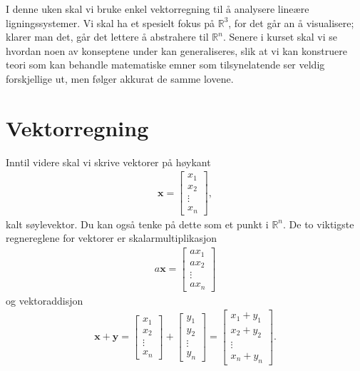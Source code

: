 

\label{ch:vektor-og-matriselikninger}






\noindent%

\noindent
I denne uken skal vi bruke enkel vektorregning til å analysere lineære ligningssystemer. Vi skal ha et spesielt fokus på $\mathbb{R}^3$, for det går an å visualisere; klarer man det, går det lettere å abstrahere til $\mathbb{R}^n$. Senere i kurset skal vi se hvordan noen av konseptene under kan generaliseres, slik at vi kan konstruere teori som kan behandle matematiske emner som tilsynelatende ser veldig forskjellige ut, men følger akkurat de samme lovene. 

\section*{Vektorregning}
Inntil videre skal vi skrive vektorer på høykant
\begin{align*}
\mathbf{x}=
\begin{bmatrix}
x_1  \\
x_2 \\
\vdots \\
x_n
\end{bmatrix},
\end{align*}
kalt søylevektor. Du kan også tenke på dette som et punkt i $\mathbb{R}^n$. De to viktigste regnereglene for vektorer er skalarmultiplikasjon
\begin{align*}
a\mathbf{x}=
\begin{bmatrix}
ax_1  \\
ax_2 \\
\vdots \\
ax_n
\end{bmatrix}
\end{align*}
og vektoraddisjon
\begin{align*}
\mathbf{x}+\mathbf{y}=
\begin{bmatrix}
x_1  \\
x_2 \\
\vdots \\
x_n
\end{bmatrix}
+
\begin{bmatrix}
y_1  \\
y_2 \\
\vdots \\
y_n
\end{bmatrix}
=
\begin{bmatrix}
x_1 + y_1  \\
x_2 + y_2\\
\vdots \\
x_n + y_n
\end{bmatrix}.
\end{align*}
